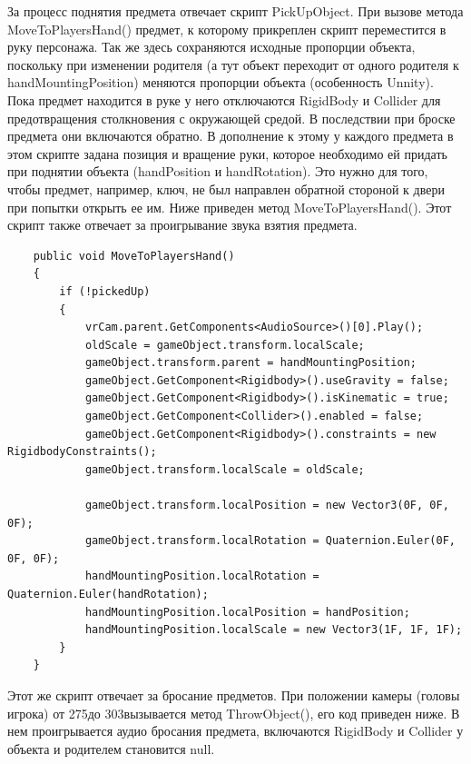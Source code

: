 За процесс поднятия предмета отвечает скрипт PickUpObject. При вызове метода MoveToPlayersHand() предмет, к которому прикреплен скрипт переместится в руку персонажа. Так же здесь сохраняются исходные пропорции объекта, поскольку при изменении родителя (а тут объект переходит от одного родителя к handMountingPosition) меняются пропорции объекта (особенность Unnity). Пока предмет находится в руке у него отключаются RigidBody и Collider для предотвращения столкновения с окружающей средой. В последствии при броске предмета они включаются обратно. В дополнение к этому у каждого предмета в этом скрипте задана позиция и вращение руки, которое необходимо ей придать при поднятии объекта (handPosition и handRotation). Это нужно для того, чтобы предмет, например, ключ, не был направлен обратной стороной к двери при попытки открыть ее им. Ниже приведен метод MoveToPlayersHand(). Этот скрипт также отвечает за проигрывание звука взятия предмета.

\begin{small}
	\begin{verbatim}
    public void MoveToPlayersHand()
    {
        if (!pickedUp)
        {
            vrCam.parent.GetComponents<AudioSource>()[0].Play();
            oldScale = gameObject.transform.localScale;
            gameObject.transform.parent = handMountingPosition;
            gameObject.GetComponent<Rigidbody>().useGravity = false;
            gameObject.GetComponent<Rigidbody>().isKinematic = true;
            gameObject.GetComponent<Collider>().enabled = false;
            gameObject.GetComponent<Rigidbody>().constraints = new RigidbodyConstraints();
            gameObject.transform.localScale = oldScale;
            
            gameObject.transform.localPosition = new Vector3(0F, 0F, 0F);
            gameObject.transform.localRotation = Quaternion.Euler(0F, 0F, 0F);
            handMountingPosition.localRotation = Quaternion.Euler(handRotation);
            handMountingPosition.localPosition = handPosition;
            handMountingPosition.localScale = new Vector3(1F, 1F, 1F);
        }
    }
	\end{verbatim}
\end{small}


Этот же скрипт отвечает за бросание предметов. При положении камеры (головы игрока) от 275\degr до 303\degr вызывается метод ThrowObject(), его код приведен ниже. В нем проигрывается аудио бросания предмета, включаются RigidBody и Collider у объекта и родителем становится null.

